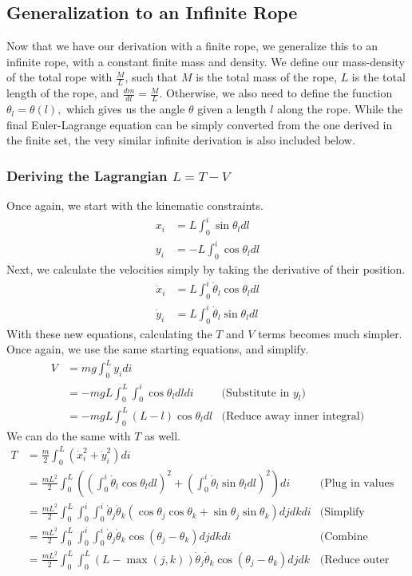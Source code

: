 \documentclass{article}
\begin{document}
\subsection{Generalization to an Infinite Rope}
Now that we have our derivation with a finite rope, we generalize this to an infinite rope, with a constant finite mass and density. We define our mass-density of the total rope with $\frac{M}{L}$, such that $M$ is the total mass of the rope, $L$ is the total length of the rope, and $\frac{dm}{dl} = \frac{M}{L}$. Otherwise, we also need to define the function $\theta_l=\theta(l),$ which gives us the angle $\theta$ given a length $l$ along the rope. While the final Euler-Lagrange equation can be simply converted from the one derived in the finite set, the very similar infinite derivation is also included below.
\subsubsection{Deriving the Lagrangian \texorpdfstring{$L=T-V$}{L=T-V}}
Once again, we start with the kinematic constraints.
\begin{align*}
	x_i &= L\int_0^i\sin\theta_ldl\\
	y_i &= -L\int_0^i\cos\theta_ldl
\end{align*}
Next, we calculate the velocities simply by taking the derivative of their position.
\begin{align*}
	\dot x_i &= L\int_0^i\dot\theta_l\cos\theta_ldl\\
	\dot y_i &= L\int_0^i\dot\theta_l\sin\theta_ldl
\end{align*}
With these new equations, calculating the $T$ and $V$ terms becomes much simpler. Once again, we use the same starting equations, and simplify.
\begin{align*}
	V &= mg\int_0^L y_idi \\
	&=-mgL\int_0^L\int_0^i\cos{\theta_l}dldi
	&\text{(Substitute in $y_l$)}\\
	&=-mgL\int_0^L(L-l)\cos{\theta_l}dl
	&\text{(Reduce away inner integral)}
\end{align*}
We can do the same with $T$ as well.
\begin{align*}
	T &= \frac{m}{2}\int_0^L\left(\dot{x}_i^2+\dot{y}_i^2\right)di\\
	&= \frac{mL^2}{2}\int_0^L\left(\left(\int_0^i\dot\theta_l\cos\theta_ldl\right)^2+\left(\int_0^i\dot\theta_l\sin\theta_ldl\right)^2\right)di
	&\text{(Plug in values for sum)}\\
	&= \frac{mL^2}{2}\int_0^L\int_0^i\int_0^i\dot\theta_j\dot\theta_k\left(\cos\theta_j\cos\theta_k+\sin\theta_j\sin\theta_k\right)djdkdi
	&\text{(Simplify integrals)}\\
	&= \frac{mL^2}{2}\int_0^L\int_0^i\int_0^i\dot\theta_j\dot\theta_k\cos(\theta_j-\theta_k)djdkdi
	&\text{(Combine integrals)}\\
	&= \frac{mL^2}{2}\int_0^L\int_0^L(L-\max(j,k))\dot\theta_j\dot\theta_k\cos(\theta_j-\theta_k)djdk
	&\text{(Reduce outer integral)}\\
\end{align*}
\end{document}
